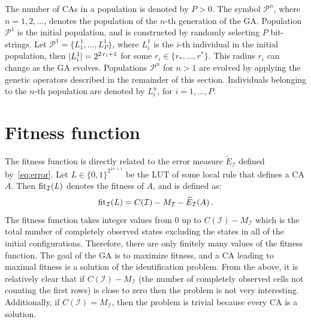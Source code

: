 The number of CAs in a population is denoted by $P>0$. The symbol $\mathcal{P}^n$, where $n=1,2,\dotsc$, denotes the population of the $n$-th generation of the GA. Population $\mathcal{P}^1$ is the initial population, and is constructed by randomly selecting $P$ bit-strings. Let $\mathcal{P}^1 = \{L^1_1,\dotsc,L^1_P\}$, where $L^1_i$ is the $i$-th individual in the initial population, then $\lvert L^1_i\rvert = 2^{2\,r_i+1}$ for some $r_i\in\{r_{\ast},\dotsc,r^{\ast}\}$. This radius $r_i$ can change as the GA evolves. Populations $\mathcal{P}^n$ for $n>1$ are evolved by applying the genetic operators described in the remainder of this section. Individuals belonging to the $n$-th population are denoted by $L^n_i$, for $i=1,\dotsc,P$.

\section{Fitness function}\label{sec:fitness}
The fitness function is directly related to the error measure $\widetilde{E}_{\mathcal{I}}$ defined by~\eqref{eq:error}.
Let $L\in\{0,1\}^{2^{2\,r+1}}$ be the LUT of some local rule that defines a CA $A$. Then $\operatorname{fit}_{\mathcal{I}}(L)$ denotes the fitness of $A$, and is defined as:
\begin{equation}
	\operatorname{fit}_{\mathcal{I}}(L) = C(\mathcal{I}) - M_\mathcal{I} - \widetilde{E}_\mathcal{I}(A)\,.
	\label{eq:fit-org}
\end{equation}
The fitness function takes integer values from 0 up to $C(\mathcal{I}) - M_\mathcal{I}$ which is the total number of completely observed states excluding the states in all of the initial configurations. Therefore, there are only finitely many values of the fitness function. The goal of the GA is to maximize fitness, and a CA leading to maximal fitness is a solution of the identification problem.
From the above, it is relatively clear that if $C(\mathcal{I}) - M_\mathcal{I}$ (the number of completely observed cells not counting the first rows) is close to zero then the problem is not very interesting. 
Additionally, if $C(\mathcal{I}) = M_\mathcal{I}$, then the problem is trivial because every CA is a solution.

